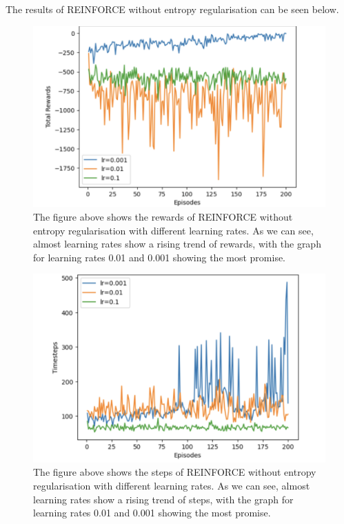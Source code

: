 \documentclass{article}
\begin{document}
The results of REINFORCE without entropy regularisation can be seen below.

\begin{figure}[htbp]
\centering
\includegraphics[width=0.9\linewidth]{Report/images/reinforce_basic_image1.png}
\caption{\label{fig:Reinforce Rewards}The figure above shows the rewards of REINFORCE without entropy regularisation with different learning rates. As we can see, almost learning rates show a rising trend of rewards, with the graph for learning rates 0.01 and 0.001 showing the most promise. }
\end{figure}


\begin{figure}[htbp]
\centering
\includegraphics[width=0.9\linewidth]{Report/images/reinforce_basic_image2.png}
\caption{\label{fig:ReinforceEntropy_Rewards}The figure above shows the steps of REINFORCE without entropy regularisation with different learning rates. As we can see, almost learning rates show a rising trend of steps, with the graph for learning rates 0.01 and 0.001 showing the most promise. }
\end{figure}
\end{document}
